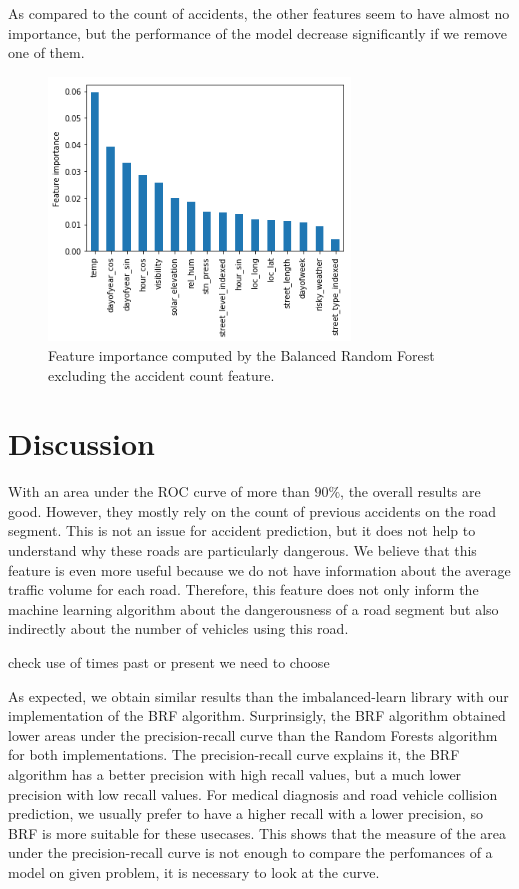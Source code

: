 \documentclass[conference]{IEEEtran}
\newcommand{\todo}[1]{\colorlet{saved}{.}\color{blue}#1\color{saved}}
\begin{document}
As compared to the count of accidents, the other features seem to have almost no
importance, but the performance of the model decrease significantly if we
remove one of them. 

\begin{figure}[htbp]
\centerline{\includegraphics[height=7cm, keepaspectratio]{figures/brf_fi_nocount.png}}
\caption{Feature importance computed by the Balanced Random Forest excluding the accident count feature.}
\label{feature importances}
\end{figure}

\section{Discussion}

With an area under the ROC curve of more than $90\%$, the overall results are good.
However, they mostly rely on the count of previous accidents on the road segment. 
This is not an issue for accident prediction, but it does not help to 
understand why these roads are particularly dangerous. We believe that
this feature is even more useful because we do not have information
about the average traffic volume for each road. Therefore, this feature does
not only inform the machine learning algorithm about the dangerousness of a road
segment but also indirectly about the number of vehicles using this road.

\todo{check use of times past or present we need to choose}

As expected, we obtain similar results than the imbalanced-learn library with our implementation of the BRF algorithm. Surprinsigly, the BRF algorithm obtained lower areas under the precision-recall curve than the Random Forests algorithm for both implementations. The precision-recall curve explains it, the BRF algorithm has a better precision with high recall values, but a much lower precision with low recall values. For medical diagnosis and road vehicle collision prediction, we usually prefer to have a higher recall with a lower precision, so BRF is more suitable for these usecases. This shows that the measure of the area under the precision-recall curve is not enough to compare the perfomances of a model on given problem, it is necessary to look at the curve. 
\end{document}
